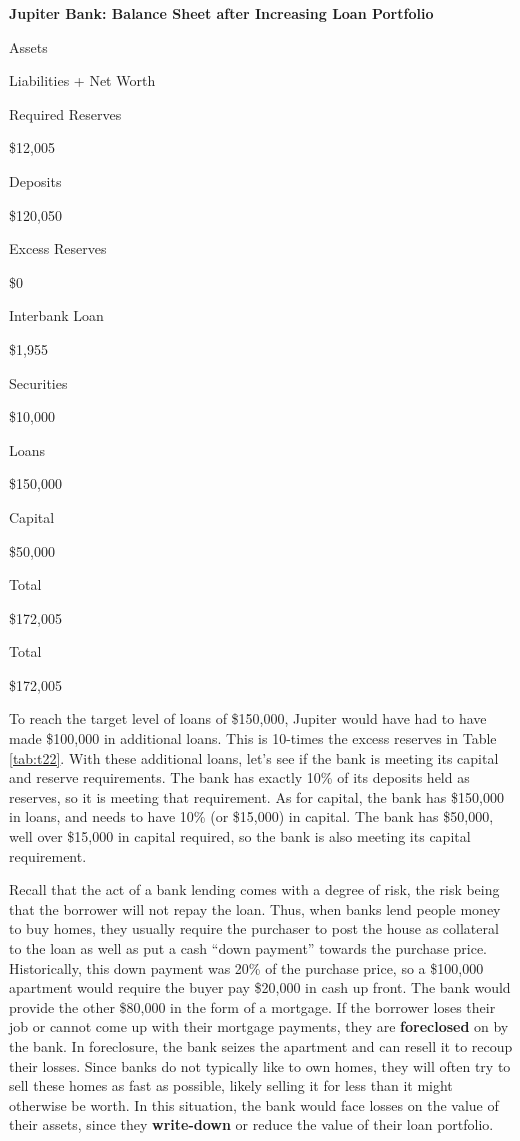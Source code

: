 \documentclass[
]{book}
\begin{document}
\label{tab:t23}\textbf{Jupiter Bank: Balance Sheet after Increasing Loan Portfolio}

Assets

Liabilities + Net Worth

Required Reserves

\$12,005

Deposits

\$120,050

Excess Reserves

\$0

Interbank Loan

\$1,955

Securities

\$10,000

Loans

\$150,000

Capital

\$50,000

Total

\$172,005

Total

\$172,005

To reach the target level of loans of \$150,000, Jupiter would have had to have made \$100,000 in additional loans. This is 10-times the excess reserves in Table \ref{tab:t22}. With these additional loans, let's see if the bank is meeting its capital and reserve requirements. The bank has exactly 10\% of its deposits held as reserves, so it is meeting that requirement. As for capital, the bank has \$150,000 in loans, and needs to have 10\% (or \$15,000) in capital. The bank has \$50,000, well over \$15,000 in capital required, so the bank is also meeting its capital requirement.

Recall that the act of a bank lending comes with a degree of risk, the risk being that the borrower will not repay the loan. Thus, when banks lend people money to buy homes, they usually require the purchaser to post the house as collateral to the loan as well as put a cash ``down payment'' towards the purchase price. Historically, this down payment was 20\% of the purchase price, so a \$100,000 apartment would require the buyer pay \$20,000 in cash up front. The bank would provide the other \$80,000 in the form of a mortgage. If the borrower loses their job or cannot come up with their mortgage payments, they are \textbf{foreclosed} on by the bank. In foreclosure, the bank seizes the apartment and can resell it to recoup their losses. Since banks do not typically like to own homes, they will often try to sell these homes as fast as possible, likely selling it for less than it might otherwise be worth. In this situation, the bank would face losses on the value of their assets, since they \textbf{write-down} or reduce the value of their loan portfolio.
\end{document}
